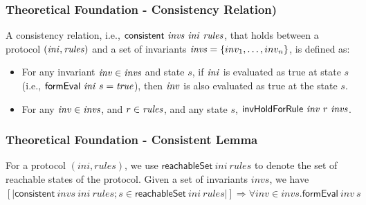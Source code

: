 \documentclass{beamer}
\begin{document}
\begin{frame}\frametitle{Theoretical Foundation - Consistency Relation)}


A consistency relation, i.e., $\mathsf{consistent}~ {\it invs} ~{\it ini}~ {\it rules}$,
that holds between a protocol $({\it ini}, {\it rules})$ and
a set of invariants ${\it invs}=\{inv_1,\ldots, inv_n\}$,  is defined as:
%
\begin{itemize}
\item For any invariant ${\it inv} \in {\it invs}$ and state $s$,
if ${\it ini}$ is
evaluated as true at state $s$
(i.e., $\mathsf{formEval}~{\it ini}~s={\it true}$), then ${\it inv}$ is also evaluated as true at the state $s$.

\item For any ${\it inv} \in {\it invs}$,  and $r\in {\it rules}$, and any state $s$,
$\mathsf{invHoldForRule}~{\it inv}~r~{\it invs}$.
\end{itemize}


\end{frame}




\begin{frame}\frametitle{Theoretical Foundation - Consistent Lemma}

For a protocol $( ini,  rules)$,
we use $\mathsf{reachableSet}~   ini~ rules$
to denote the set of reachable states of the protocol.
Given a set of invariants $ invs$,
we have
$[| \mathsf{consistent}~  invs ~ ini~  rules;
  s \in \mathsf{reachableSet}~  ini~rules|]\Longrightarrow
  \forall  inv \in invs. \mathsf{formEval}~ inv ~s$
\end{frame}
\end{document}
